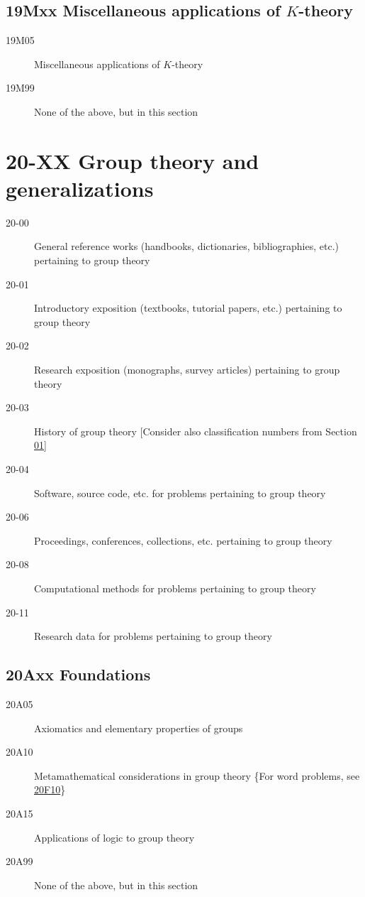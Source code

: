 \documentclass[letterpaper]{article}
\begin{document}
\subsection*{19Mxx  Miscellaneous applications of $K$-theory }\label{19Mxx}
\begin{description}
\item [19M05]\label{19M05} Miscellaneous applications of $K$-theory
\item [19M99]\label{19M99} None of the above, but in this section
\end{description}
\section*{20-XX Group theory and generalizations }\label{20-XX}
\begin{description}
\item [20-00]\label{20-00} General reference works (handbooks, dictionaries, bibliographies, etc.) pertaining to group theory
\item [20-01]\label{20-01} Introductory exposition (textbooks, tutorial papers, etc.) pertaining to group theory
\item [20-02]\label{20-02} Research exposition (monographs, survey articles) pertaining to group theory
\item [20-03]\label{20-03} History of group theory [Consider also classification numbers from Section \hyperref[01-XX]{01}]
\item [20-04]\label{20-04} Software, source code, etc. for problems pertaining to group theory
\item [20-06]\label{20-06} Proceedings, conferences, collections, etc. pertaining to group theory
\item [20-08]\label{20-08} Computational methods for problems pertaining to group theory
\item [20-11]\label{20-11} Research data for problems pertaining to group theory  
\end{description}
\subsection*{20Axx  Foundations }\label{20Axx}
\begin{description}  
\item [20A05]\label{20A05} Axiomatics and elementary properties of groups
\item [20A10]\label{20A10} Metamathematical considerations in group theory \{For word problems, see \hyperref[20F10]{20F10}\}
\item [20A15]\label{20A15} Applications of logic to group theory
\item [20A99]\label{20A99} None of the above, but in this section
\end{description}
\end{document}
